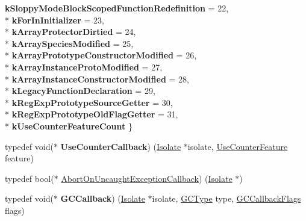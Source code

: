 \begin{DoxyCompactItemize}
{\bfseries k\+Sloppy\+Mode\+Block\+Scoped\+Function\+Redefinition} = 22, 
\\*
{\bfseries k\+For\+In\+Initializer} = 23, 
\\*
{\bfseries k\+Array\+Protector\+Dirtied} = 24, 
\\*
{\bfseries k\+Array\+Species\+Modified} = 25, 
\\*
{\bfseries k\+Array\+Prototype\+Constructor\+Modified} = 26, 
\\*
{\bfseries k\+Array\+Instance\+Proto\+Modified} = 27, 
\\*
{\bfseries k\+Array\+Instance\+Constructor\+Modified} = 28, 
\\*
{\bfseries k\+Legacy\+Function\+Declaration} = 29, 
\\*
{\bfseries k\+Reg\+Exp\+Prototype\+Source\+Getter} = 30, 
\\*
{\bfseries k\+Reg\+Exp\+Prototype\+Old\+Flag\+Getter} = 31, 
\\*
{\bfseries k\+Use\+Counter\+Feature\+Count}
 \}
\item 
typedef void($\ast$ {\bfseries Use\+Counter\+Callback}) (\hyperlink{classv8_1_1_isolate}{Isolate} $\ast$isolate, \hyperlink{classv8_1_1_isolate_aed6909379c3f2820cb3084710b73385d}{Use\+Counter\+Feature} feature)\hypertarget{classv8_1_1_isolate_a7537ead98ee88eec2976348ba992935c}{}\label{classv8_1_1_isolate_a7537ead98ee88eec2976348ba992935c}

\item 
typedef bool($\ast$ \hyperlink{classv8_1_1_isolate_aeb1d49e500d9521b42743a6a740271e2}{Abort\+On\+Uncaught\+Exception\+Callback}) (\hyperlink{classv8_1_1_isolate}{Isolate} $\ast$)
\item 
typedef void($\ast$ {\bfseries G\+C\+Callback}) (\hyperlink{classv8_1_1_isolate}{Isolate} $\ast$isolate, \hyperlink{namespacev8_ac109d6f27e0c0f9ef4e98bcf7a806cf2}{G\+C\+Type} type, \hyperlink{namespacev8_a247c37a849f4d6c293b9b16e94e1944b}{G\+C\+Callback\+Flags} flags)\hypertarget{classv8_1_1_isolate_aba82364e6057ee6df3fb896a7e972750}{}\label{classv8_1_1_isolate_aba82364e6057ee6df3fb896a7e972750}

\end{DoxyCompactItemize}
